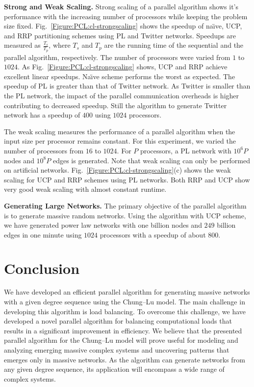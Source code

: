 \documentclass[conference,letterpaper,10pt]{IEEEtran}
\newcommand{\Figure}{Fig.\xspace}
\begin{document}
\textbf{Strong and Weak Scaling.}
Strong scaling of a parallel algorithm shows it's performance with the increasing number of processors while keeping the problem size fixed. \Figure~\ref{Figure:PCL:cl-strongscaling} shows the speedup of na\"{\i}ve, UCP, and RRP partitioning schemes using PL  and Twitter networks. Speedups are measured as $\frac{T_s}{T_p}$, where $T_s$ and $T_p$ are the running time of the sequential and the parallel algorithm, respectively. The number of processors were varied from $1$ to $1024$. As \Figure~\ref{Figure:PCL:cl-strongscaling} shows, UCP and RRP achieve excellent linear speedups. Na\"{\i}ve scheme performs the worst as expected. The speedup of PL is greater than that of Twitter network. As Twitter is smaller than the PL network, the impact of the parallel communication overheads is higher contributing to decreased speedup. Still the algorithm to generate Twitter network has a speedup of $400$ using $1024$ processors. 

The weak scaling measures the performance of a parallel algorithm when the input size per processor remains constant. For this experiment, we varied the number of processors from $16$ to $1024$. For $P$ processors, a PL network with $10^6P$ nodes and $10^8P$ edges is generated. Note that weak scaling can only be performed on artificial networks. \Figure~\ref{Figure:PCL:cl-strongscaling}(c) shows the weak scaling for UCP and RRP schemes using PL networks. Both RRP and UCP show very good weak scaling with almost constant runtime.

\textbf{Generating Large Networks.}
The primary objective of the parallel algorithm is to generate massive random networks. Using the algorithm with UCP scheme,  we have generated power law networks with one billion nodes and $249$ billion edges in one minute using $1024$ processors with a speedup of about $800$.

\section{Conclusion}
\label{Section:PCL:conclusion}
We have developed an efficient parallel algorithm for generating massive networks with a given degree sequence using the Chung--Lu model. The main challenge in developing this algorithm is load balancing. To overcome this challenge, we have developed a novel parallel algorithm for balancing computational loads that results in a significant improvement in efficiency. We believe that the presented parallel algorithm for the Chung--Lu model will prove useful for modeling and analyzing emerging massive complex systems and uncovering patterns that emerges only in massive networks. As the algorithm can generate networks from any given degree sequence, its application will encompass a wide range of complex systems.
\end{document}
